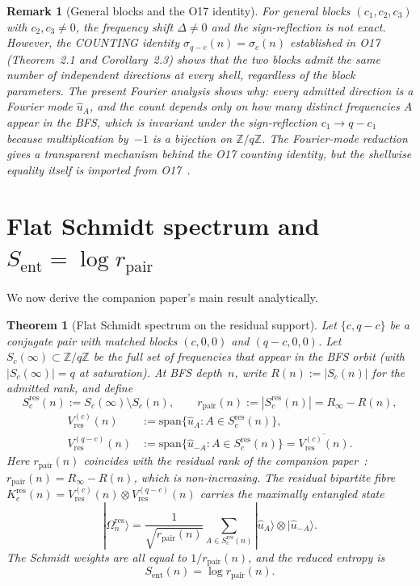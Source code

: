 \documentclass[11pt]{article}
\newtheorem{theorem}{Theorem}
\newtheorem{remark}{Remark}
\newcommand{\Sent}{S_{\mathrm{ent}}}
\newcommand{\rpair}{r_{\mathrm{pair}}}
\newcommand{\ue}{\hat{u}}
\begin{document}
    \begin{remark}[General blocks and the O17 identity]
For general blocks $(c_1,c_2,c_3)$ with $c_2,c_3\neq 0$, the frequency shift
$\Delta\neq 0$ and the sign-reflection is not exact.
However, the COUNTING identity $\sigma_{q-c}(n) = \sigma_c(n)$ established in
\emph{O17}~\cite{Beau2026a21} (Theorem~2.1 and Corollary~2.3) shows that the
two blocks admit the same number of independent directions at every shell, regardless
of the block parameters.
The present Fourier analysis shows why: every admitted direction is a Fourier mode
$\ue_A$, and the count depends only on how many distinct frequencies $A$ appear in
the BFS, which is invariant under the sign-reflection $c_1\to q-c_1$ because
multiplication by~$-1$ is a bijection on $\mathbb{Z}/q\mathbb{Z}$.
The Fourier-mode reduction gives a transparent mechanism behind the O17
counting identity, but the shellwise equality itself is imported from
\emph{O17}~\cite{Beau2026a21}.
    \end{remark}

  \section{Flat Schmidt spectrum and \texorpdfstring{$\Sent = \log \rpair$}{S=log r}}
    \label{sec:entropy}

    We now derive the companion paper's main result analytically.

    \begin{theorem}[Flat Schmidt spectrum on the residual support]
      \label{thm:flat}
      Let $\{c,q-c\}$ be a conjugate pair with matched blocks $(c,0,0)$ and $(q-c,0,0)$.
      Let $S_c(\infty)\subset\mathbb{Z}/q\mathbb{Z}$ be the full set of frequencies that
      appear in the BFS orbit (with $|S_c(\infty)|=q$ at saturation).
      At BFS depth~$n$, write $R(n):=|S_c(n)|$ for the admitted rank, and define
      \[
        S_c^{\mathrm{res}}(n)
        := S_c(\infty)\setminus S_c(n),
        \qquad
        \rpair(n)
        := |S_c^{\mathrm{res}}(n)| = R_\infty - R(n),
      \]
      \begin{align*}
        V^{(c)}_{\mathrm{res}}(n)
        &:= \mathrm{span}\bigl\{\ue_A : A\in S_c^{\mathrm{res}}(n)\bigr\},\\
        V^{(q-c)}_{\mathrm{res}}(n)
        &:= \mathrm{span}\bigl\{\ue_{-A} : A\in S_c^{\mathrm{res}}(n)\bigr\}
        = \overline{V^{(c)}_{\mathrm{res}}(n)}.
      \end{align*}
      Here $\rpair(n)$ coincides with the residual rank of the companion
      paper~\cite{Beau2026entnote}: $\rpair(n)=R_\infty-R(n)$, which is non-increasing.
      The residual bipartite fibre
      $K^{\mathrm{res}}_{c}(n) = V^{(c)}_{\mathrm{res}}(n)\otimes V^{(q-c)}_{\mathrm{res}}(n)$
      carries the maximally entangled state
      \[
        |\Omega^{\mathrm{res}}_n\rangle
        = \frac{1}{\sqrt{\rpair(n)}}\sum_{A\in S_c^{\mathrm{res}}(n)}
        |\ue_A\rangle\otimes|\ue_{-A}\rangle.
      \]
      The Schmidt weights are all equal to $1/\rpair(n)$, and the reduced entropy is
      \[
        \Sent(n) = \log \rpair(n).
      \]
    \end{theorem}
\end{document}

